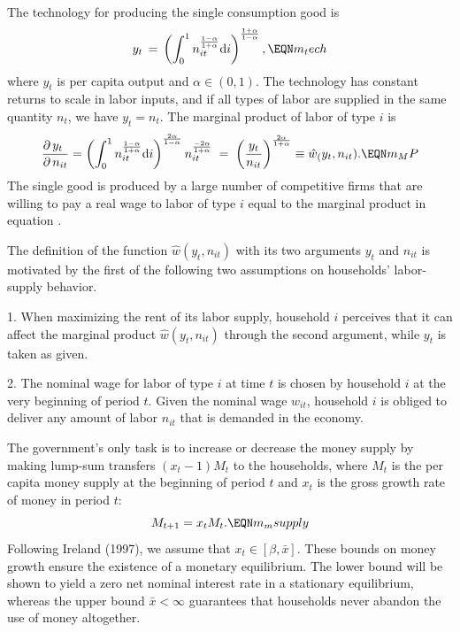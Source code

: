 The technology for producing the single consumption good is
$$
y_t \,=\, \left( \int_0^1 n_{it}^{{1-\alpha \over 1+\alpha}} {\rm d}i
    \right)^{{1+\alpha \over 1-\alpha}},
                                                     \EQN m_tech
$$
where $y_t$ is per capita output and $\alpha \in (0,1)$. The technology has
constant returns to scale in labor inputs, and if all types of labor
are supplied in the same quantity $n_t$, we have $y_t=n_t$. The
marginal product of labor of type $i$ is
$$
{\partial \, y_t \hfill \over \partial \, n_{it} } =
\left( \int_0^1 n_{it}^{{1-\alpha \over 1+\alpha}} {\rm d}i
    \right)^{{2\alpha \over 1-\alpha}} n_{it}^{{-2\alpha \over 1+\alpha}}
\;=\;
\left({ y_t \over n_{it} }\right)^{{2\alpha \over 1+\alpha}}
\equiv \hat w_(y_t, n_{it}).                                 \EQN m_MP
$$
The single good is produced by a large number of competitive firms
that are willing to pay a real wage to labor of type $i$ equal to the
marginal product in equation .


The definition of the function $\hat w(y_t, n_{it})$ with its two
arguments $y_t$ and $n_{it}$ is motivated by the first of the
following two assumptions on households' labor-supply
behavior.
\medskip
\item{1.} When maximizing the rent of its labor supply,
household $i$ perceives that it can affect the marginal product
$\hat w(y_t, n_{it})$ through the second argument, while $y_t$ is
taken as given.
\medskip
\item{2.} The nominal wage for labor of type $i$ at time $t$ is
chosen by household $i$ at the very beginning of period $t$.
Given the nominal wage $w_{it}$, household $i$ is
obliged to deliver any amount of labor $n_{it}$ that is demanded in
the economy.
%




The government's only task is to increase or decrease
the money supply by making lump-sum transfers $(x_t-1)M_t$ to the
households, where $M_t$ is the per capita money supply at the
beginning of period $t$ and $x_t$ is the gross growth rate of
money in period $t$:
$$ M_{t+1} = x_t M_t.                                     \EQN m_msupply
$$
Following Ireland (1997),
we assume that $x_t \in [\beta, \bar x]$. These bounds on money growth
ensure the existence of a monetary equilibrium. The lower bound will be
shown to yield a zero net nominal interest rate in a stationary
equilibrium, whereas the upper bound $\bar x < \infty$
guarantees that households never abandon the use of money altogether.


